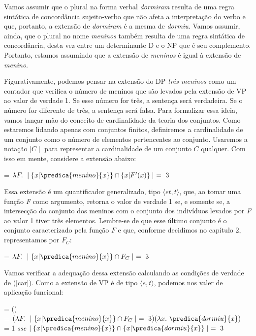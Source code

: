 \n Vamos assumir que o plural na forma verbal \textit{dormiram}
resulta de uma regra sintática de concordância sujeito-verbo que
não afeta a interpretação do verbo e que, portanto, a extensão de
\textit{dormiram} é a mesma de \textit{dormiu}. Vamos assumir, ainda, que o plural no nome \textit{meninos} também resulta de uma
regra sintática de concordância, desta vez entre um determinante D e
o NP que é seu complemento. Portanto, estamos assumindo que a
extensão de \textit{meninos} é igual à extensão de
\textit{menino}.

Figurativamente, podemos pensar na extensão do DP \textit{três
meninos} como um contador que verifica o número de meninos que são
levados pela extensão de VP ao valor de verdade 1. Se esse número
for três, a sentença será verdadeira. Se o número for diferente de
três, a sentença será falsa. Para formalizar essa ideia, vamos
lançar mão do conceito de cardinalidade da teoria dos conjuntos. Como estaremos lidando apenas com conjuntos finitos, definiremos a cardinalidade de um conjunto como o número de elementos pertencentes ao conjunto. Usaremos a notação $\mid C \mid$ para representar a cardinalidade de um conjunto $C$ qualquer. Com isso em mente, considere a extensão abaixo:

\begin{exe}
	\ex {} = $\lambda F.\ \mid\{x | \predica{menino}{x}\}\cap\{x | F'(x)\}\mid\ =\ 3$
\end{exe}

\n Essa extensão é um quantificador generalizado, tipo $\langle
et,t\rangle$, que, ao tomar uma função \textit{F} como argumento,
retorna o valor de verdade 1 se, e somente se, a intersecção do
conjunto dos meninos com o conjunto dos indivíduos levados por
\textit{F} ao valor 1 tiver três elementos. Lembre-se de que esse último conjunto é o conjunto caracterizado pela função $F$ e que, conforme decidimos no capítulo 2, representamos por $F_{C}$:

\begin{exe}
	\ex {} = $\lambda F.\ \mid\{x | \predica{menino}{x}\}\cap F_{C}\mid\ =\ 3$
\end{exe}


\n Vamos verificar a
adequação dessa extensão calculando as condições de verdade de
(\ref{car}). Como a extensão de VP é de tipo $\langle e,t\rangle$,
podemos nos valer de aplicação funcional:

\begin{exe}
	\ex {} = () \\
	= $(\lambda F.\ \mid\{x | \predica{menino}{x}\}\cap F_{C}\mid\ =\ 3)(\lambda x.\ \predica{dormiu}{x})$\\
	= 1 \textit{sse} $\mid \{x | \predica{menino}{x}\}\cap\{x | \predica{dormiu}{x}\}\mid\ =\ 3$
\end{exe}

